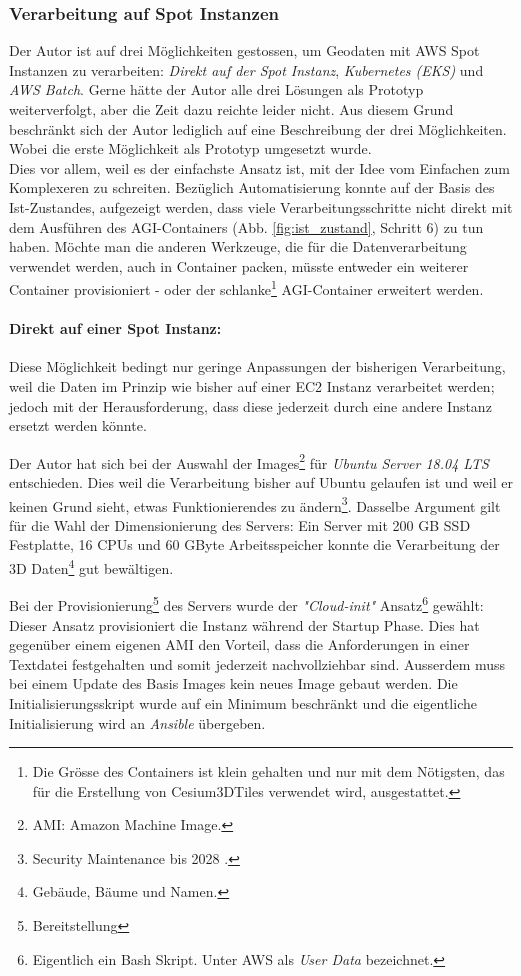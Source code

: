 \subsubsection{Verarbeitung auf Spot Instanzen}
Der Autor ist auf drei Möglichkeiten gestossen, um Geodaten mit AWS Spot Instanzen zu verarbeiten: \emph{Direkt auf der Spot Instanz}, \emph{Kubernetes (EKS)} und \emph{AWS Batch}. Gerne hätte der Autor alle drei Lösungen als Prototyp weiterverfolgt, aber die Zeit dazu reichte leider nicht. Aus diesem Grund beschränkt sich der Autor lediglich auf eine Beschreibung der drei Möglichkeiten. Wobei die erste Möglichkeit als Prototyp umgesetzt wurde.\\
Dies vor allem, weil es der einfachste Ansatz ist, mit der Idee vom Einfachen zum Komplexeren zu schreiten.
Bezüglich Automatisierung konnte auf der Basis des Ist-Zustandes, aufgezeigt werden, dass viele Verarbeitungsschritte nicht direkt mit dem Ausführen des AGI-Containers (Abb. \ref{fig:ist_zustand}, Schritt 6) zu tun haben. Möchte man die anderen Werkzeuge, die für die Datenverarbeitung verwendet werden, auch in Container packen, müsste entweder ein weiterer Container provisioniert - oder der schlanke\footnote{Die Grösse des Containers ist klein gehalten und nur mit dem Nötigsten, das für die Erstellung von Cesium3DTiles verwendet wird, ausgestattet.} AGI-Container erweitert werden.

\paragraph{Direkt auf einer Spot Instanz:}
Diese Möglichkeit bedingt nur geringe Anpassungen der bisherigen Verarbeitung, weil die Daten im Prinzip wie bisher auf einer EC2 Instanz verarbeitet werden; jedoch mit der Herausforderung, dass diese jederzeit durch eine andere Instanz ersetzt werden könnte.

Der Autor hat sich bei der Auswahl der Images\footnote{AMI: Amazon Machine Image.} für \emph{Ubuntu Server 18.04 LTS} entschieden. Dies weil die Verarbeitung bisher auf Ubuntu gelaufen ist und weil er keinen Grund sieht, etwas Funktionierendes zu ändern\footnote{Security Maintenance bis 2028 \cite{Ubuntu2020}.}. Dasselbe Argument gilt für die Wahl der Dimensionierung des Servers: Ein Server mit 200 GB SSD Festplatte, 16 CPUs und 60 GByte Arbeitsspeicher konnte die Verarbeitung der 3D Daten\footnote{Gebäude, Bäume und Namen.} gut bewältigen.

Bei der Provisionierung\footnote{Bereitstellung} des Servers wurde der \emph{"Cloud-init"} Ansatz\footnote{Eigentlich ein Bash Skript. Unter AWS als \emph{User Data} bezeichnet.} gewählt: Dieser Ansatz provisioniert die Instanz während der Startup Phase. Dies hat gegenüber einem eigenen AMI den Vorteil, dass die Anforderungen in einer Textdatei festgehalten und somit jederzeit nachvollziehbar sind. Ausserdem muss bei einem Update des Basis Images kein neues Image gebaut werden.
Die Initialisierungsskript wurde auf ein Minimum beschränkt und die eigentliche Initialisierung wird an \emph{Ansible} übergeben. 

